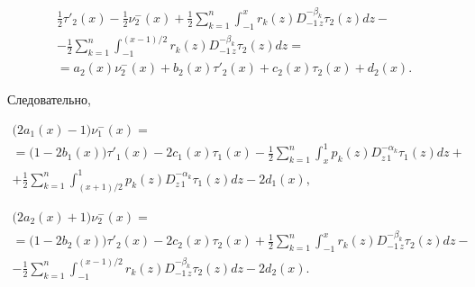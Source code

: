 \begin{multline}

\frac{1}{2}{\tau '_2}(x) - \frac{1}{2}\nu _2^ - (x) + \frac{1}{2}\sum\limits_{k = 1}^n { \int _{ - 1}^x {{r_k}(z)D_{ - 1\,z}^{ - {\beta _k}}{\tau _2}(z)dz} } - \\

  - \frac{1}{2}\sum\limits_{k = 1}^n { \int _{ - 1}^{({{x - 1}})/{2}} {{r_k}(z)D_{ - 1\,z}^{ - {\beta _k}}{\tau _2}(z)dz} }  =

\\

= {a_2}(x)\nu _2^ - (x) + {b_2}(x){\tau '_2}(x) + {c_2}(x){\tau _2}(x) + {d_2}(x).

\label{eq:12.2}

\end{multline}

\pagebreak



\noindent

Следовательно,

\begin{multline}

 \bigl( {2{a_1}(x) - 1} \bigr)\nu _1^ - (x) = 

\\

= 

 \bigl( {1 - 2{b_1}(x)} \bigr){\tau '_1}(x) - 2{c_1}(x){\tau _1}(x) 

 - \frac{1}{2}\sum\limits_{k = 1}^n { \int _x^1 {{p_k}(z)D_{z\,1}^{ - {\alpha _k}}{\tau _1}(z)dz} } +

 \\

  + \frac{1}{2}\sum\limits_{k = 1}^n

 { \int _{({{x + 1}})/{2}}^1 {{p_k}(z)D_{z\,1}^{ - {\alpha _k}}{\tau _1}(z)dz} }  - 2{d_1}(x),

 \label{eq:13.1}

\end{multline}

\begin{multline}

\bigl(2{a_2}(x) + 1\bigr)\nu _2^ - (x) = \\

= \bigl(1 - 2{b_2}(x)\bigr){\tau '_2}(x) - 2{c_2}(x){\tau _2}(x) 

+ \frac{1}{2}\sum\limits_{k = 1}^n { \int _{ - 1}^x {{r_k}(z)D_{ - 1\,z}^{ - {\beta _k}}{\tau _2}(z)dz} }  -

\\

 - \frac{1}{2}\sum\limits_{k = 1}^n

{ \int _{ - 1}^{({{x - 1}})/{2}} {{r_k}(z)D_{ - 1\,z}^{ - {\beta _k}}{\tau _2}(z)dz} }  - 2{d_2}(x).\label{eq:13.2}

\end{multline}



